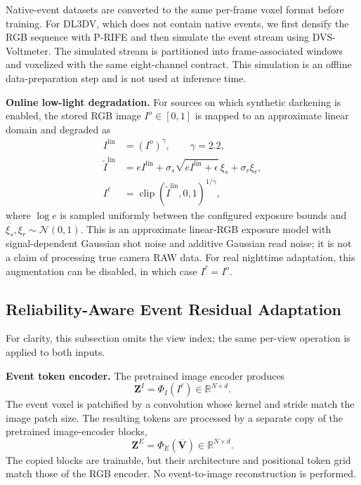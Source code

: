 Native-event datasets are converted to the same per-frame voxel format before
training.  For DL3DV, which does not contain native events, we first densify the
RGB sequence with P-RIFE and then simulate the event stream using
DVS-Voltmeter.  The simulated stream is partitioned into frame-associated
windows and voxelized with the same eight-channel contract.  This simulation
is an offline data-preparation step and is not used at inference time.

\vspace{+5pt}
\noindent\textbf{Online low-light degradation.}
For sources on which synthetic darkening is enabled, the stored RGB image
$I^{o}\in[0,1]$ is mapped to an approximate linear domain and degraded as
\begin{align}
I^{\mathrm{lin}} &= (I^{o})^{\gamma}, \qquad \gamma=2.2, \\
\widetilde I^{\mathrm{lin}}
&=eI^{\mathrm{lin}}
+\sigma_s\sqrt{eI^{\mathrm{lin}}+\epsilon}\,\xi_s
+\sigma_r\xi_r, \\
I^{\ell}
&=\operatorname{clip}(\widetilde I^{\mathrm{lin}},0,1)^{1/\gamma},
\label{eq:lowlight_degradation}
\end{align}
where $\log e$ is sampled uniformly between the configured exposure bounds and
$\xi_s,\xi_r\sim\mathcal{N}(0,1)$.  This is an approximate linear-RGB exposure
model with signal-dependent Gaussian shot noise and additive Gaussian read
noise; it is not a claim of processing true camera RAW data.  For real
nighttime adaptation, this augmentation can be disabled, in which case
$I^{\ell}=I^{o}$.


\subsection{Reliability-Aware Event Residual Adaptation}
\label{sec:method:event_integration}

For clarity, this subsection omits the view index; the same per-view operation
is applied to both inputs.

\noindent\textbf{Event token encoder.}
The pretrained image encoder produces
\begin{equation}
\mathbf{Z}^{I}=\Phi_I(I^{\ell})
\in\mathbb{R}^{N\times d}.
\label{eq:image_tokens}
\end{equation}
The event voxel is patchified by a convolution whose kernel and stride match
the image patch size.  The resulting tokens are processed by a separate copy
of the pretrained image-encoder blocks,
\begin{equation}
\mathbf{Z}^{E}=\Phi_E(\overline{\mathbf{V}})
\in\mathbb{R}^{N\times d}.
\label{eq:event_tokens}
\end{equation}
The copied blocks are trainable, but their architecture and positional token
grid match those of the RGB encoder.  No event-to-image reconstruction is
performed.

